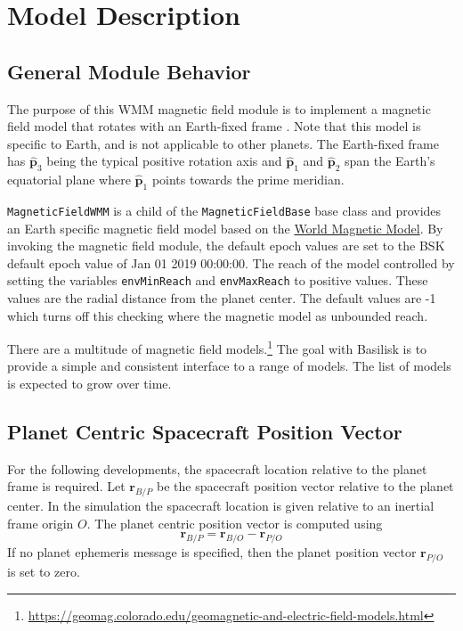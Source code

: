 
\section{Model Description}
\subsection{General Module Behavior}
The purpose of this WMM magnetic field module is to implement a magnetic field model that rotates with an Earth-fixed frame .  Note that this model is specific to Earth, and is not applicable to other planets.  The Earth-fixed frame has $\hat{\bm p}_{3}$ being the typical positive rotation axis and $\hat{\bm p}_{1}$ and $\hat{\bm p}_{2}$ span the Earth's equatorial plane where $\hat{\bm p}_{1}$ points towards the prime meridian.

{\tt MagneticFieldWMM} is a child of the {\tt MagneticFieldBase} base class and provides an Earth specific magnetic field model based on the \href{https://www.ngdc.noaa.gov/geomag/WMM/DoDWMM.shtml}{World Magnetic Model}. 
By invoking the magnetic field module, the default epoch values are set to  the BSK default epoch value of Jan 01 2019 00:00:00.
The reach of the model controlled by setting the variables {\tt envMinReach} and {\tt envMaxReach} to positive values.  These values are the radial distance from the planet center.  The default values are -1 which turns off this checking where the magnetic model as unbounded reach.  

There are a multitude of magnetic field models.\footnote{\url { https://geomag.colorado.edu/geomagnetic-and-electric-field-models.html}} The goal with Basilisk is to provide a simple and consistent interface to a range of models.  The list of models is expected to grow over time.


\subsection{Planet Centric Spacecraft Position Vector}

For the following developments, the spacecraft location relative to the planet frame is required.  Let $\bm r_{B/P}$ be the spacecraft position vector relative to the planet center.  In the simulation the spacecraft location is given relative to an inertial frame origin $O$.  The planet centric position vector is computed using
\begin{equation}
	\bm r_{B/P} = \bm r_{B/O} - \bm r_{P/O}
\end{equation}
If no planet ephemeris message is specified, then the planet position vector $\bm r_{P/O}$ is set to zero.  

